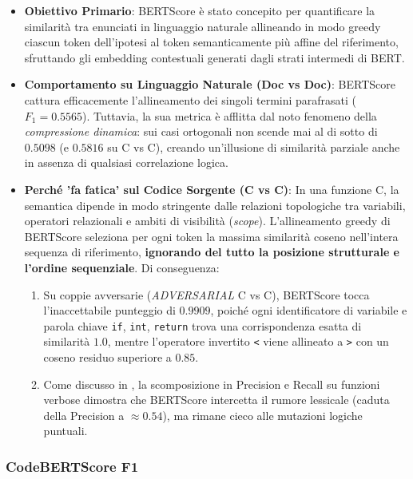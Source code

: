 \begin{itemize}[leftmargin=*, label=\textbullet]
    \item \textbf{Obiettivo Primario}: BERTScore \cite{zhang_bertscore_2020} è stato concepito per quantificare la similarità tra enunciati in linguaggio naturale allineando in modo greedy ciascun token dell'ipotesi al token semanticamente più affine del riferimento, sfruttando gli embedding contestuali generati dagli strati intermedi di BERT.
    \item \textbf{Comportamento su Linguaggio Naturale (Doc vs Doc)}: BERTScore cattura efficacemente l'allineamento dei singoli termini parafrasati ($F_1 = 0.5565$). Tuttavia, la sua metrica è afflitta dal noto fenomeno della \emph{compressione dinamica}: sui casi ortogonali non scende mai al di sotto di $0.5098$ (e $0.5816$ su C vs C), creando un'illusione di similarità parziale anche in assenza di qualsiasi correlazione logica.
    \item \textbf{Perché 'fa fatica' sul Codice Sorgente (C vs C)}: In una funzione C, la semantica dipende in modo stringente dalle relazioni topologiche tra variabili, operatori relazionali e ambiti di visibilità (\emph{scope}). L'allineamento greedy di BERTScore seleziona per ogni token la massima similarità coseno nell'intera sequenza di riferimento, \textbf{ignorando del tutto la posizione strutturale e l'ordine sequenziale}. Di conseguenza:
    \begin{enumerate}
        \item Su coppie avversarie (\emph{ADVERSARIAL} C vs C), BERTScore tocca l'inaccettabile punteggio di $\mathbf{0.9909}$, poiché ogni identificatore di variabile e parola chiave \texttt{if}, \texttt{int}, \texttt{return} trova una corrispondenza esatta di similarità $1.0$, mentre l'operatore invertito \texttt{<} viene allineato a \texttt{>} con un coseno residuo superiore a $0.85$.
        \item Come discusso in , la scomposizione in Precision e Recall su funzioni verbose dimostra che BERTScore intercetta il rumore lessicale (caduta della Precision a $\approx 0.54$), ma rimane cieco alle mutazioni logiche puntuali.
    \end{enumerate}
\end{itemize}

\subsubsection{CodeBERTScore F1}
\label{subsubsec:analisi_codebert}

